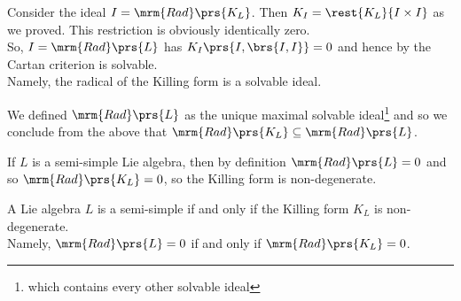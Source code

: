 \documentclass[10pt,a4paper,twoside,openany,hidelinks]{book}
\begin{document}
\begin{conclusion}
Consider the ideal $I = \mrm{Rad}\prs{K_L}$. Then $K_I = \rest{K_L}{I \times I}$ as we proved. This restriction is obviously identically zero.\\
So, $I = \mrm{Rad}\prs{L}$ has $K_I \prs{I, \brs{I,I}} = 0$ and hence by the Cartan criterion is solvable.\\
Namely, the radical of the Killing form is a solvable ideal.
\end{conclusion}

\begin{conclusion}
We defined $\mrm{Rad}\prs{L}$ as the unique maximal solvable ideal\footnote{which contains every other solvable ideal} and so we conclude from the above that $\mrm{Rad}\prs{K_L} \subseteq \mrm{Rad}\prs{L}$.
\end{conclusion}

\begin{conclusion}
If $L$ is a semi-simple Lie algebra, then by definition $\mrm{Rad}\prs{L} = 0$ and so $\mrm{Rad}\prs{K_L} = 0$, so the Killing form is non-degenerate.
\end{conclusion}

\begin{theorem}
A Lie algebra $L$ is a semi-simple if and only if the Killing form $K_L$ is non-degenerate.\\
Namely, $\mrm{Rad}\prs{L} = 0$ if and only if $\mrm{Rad}\prs{K_L} = 0$.
\end{theorem}
\end{document}
